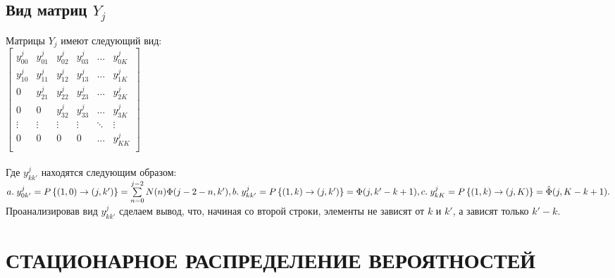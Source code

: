 \documentclass[12pt, a4paper]{article}
\begin{document}
\subsection{Вид матриц $Y_{j}$}
Матрицы $Y_{j}$ имеют следующий вид: \\
$\begin{bmatrix}
y^{j}_{00} & y^{j}_{01}& y^{j}_{02}& y^{j}_{03}& \ldots & y^{j}_{0K}\\
y^{j}_{10} & y^{j}_{11}& y^{j}_{12}& y^{j}_{13}& \ldots & y^{j}_{1K}\\
0 & y^{j}_{21}& y^{j}_{22}& y^{j}_{23}& \ldots & y^{j}_{2K}\\
0& 0& y^{j}_{32}& y^{j}_{33}& \ldots & y^{j}_{3K}\\
\vdots & \vdots & \vdots & \vdots & \ddots & \vdots\\
0 & 0 & 0 & 0 & \ldots & y^{j}_{KK}\\
\end{bmatrix}$\\ \\
Где $y^{j}_{kk'}$ находятся следующим образом:\\
$
a.\;y^{j}_{0k'} = P\left\{(1, 0) \rightarrow (j, k') \right\} = \sum\limits_{n = 0}^{j - 2}N(n)\Phi(j - 2 - n, k'),\\
b.\;y^{j}_{kk'} = P\left\{(1, k) \rightarrow (j, k') \right\} = \Phi(j, k' - k + 1) ,\\
c.\;y^{j}_{kK} = P\left\{(1, k) \rightarrow (j, K) \right\} = \hat \Phi(j, K - k + 1) .\\
$
Проанализировав вид $y^{j}_{kk'}$ сделаем вывод, что, начиная со второй строки,
элементы не зависят от $k$ и $k'$, а зависят только $k' - k$.
\section{СТАЦИОНАРНОЕ РАСПРЕДЕЛЕНИЕ ВЕРОЯТНОСТЕЙ}
\end{document}
